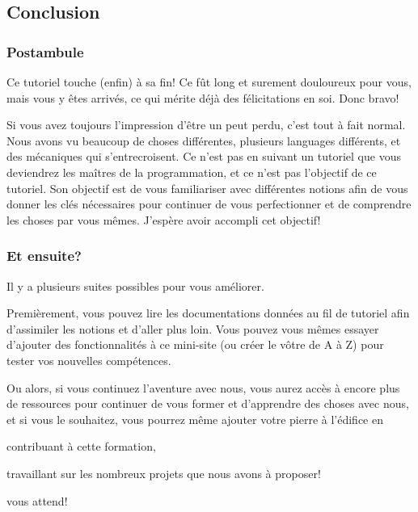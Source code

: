 \subsection{Conclusion}

\subsubsection[Postambule]{Postambule}

Ce tutoriel touche (enfin) à sa fin! Ce fût long et surement douloureux pour vous, mais vous y êtes arrivés, ce qui mérite déjà des félicitations en soi. Donc bravo!

Si vous avez toujours l'impression d'être un peut perdu, c'est tout à fait normal. Nous avons vu beaucoup de choses différentes, plusieurs languages différents, et des mécaniques qui s'entrecroisent. Ce n'est pas en suivant un tutoriel que vous deviendrez les maîtres de la programmation, et ce n'est pas l'objectif de ce tutoriel. Son objectif est de vous familiariser avec différentes notions afin de vous donner les clés nécessaires pour continuer de vous perfectionner et de comprendre les choses par vous mêmes. J'espère avoir accompli cet objectif!

\subsubsection[Et ensuite?]{Et ensuite?}

Il y a plusieurs suites possibles pour vous améliorer. 

Premièrement, vous pouvez lire les documentations données au fil de tutoriel afin d'assimiler les notions et d'aller plus loin. Vous pouvez vous mêmes essayer d'ajouter des fonctionnalités à ce mini-site (ou créer le vôtre de A à Z) pour tester vos nouvelles compétences.

Ou alors, si vous continuez l'aventure \nhitec{} avec nous, vous aurez accès à encore plus de ressources pour continuer de vous former et d'apprendre des choses avec nous, et si vous le souhaitez, vous pourrez même ajouter votre pierre à l'édifice en 
\begin{enumerate*} [1)]
    \item contribuant à cette formation,
    \item travaillant sur les nombreux projets que nous avons à proposer!
\end{enumerate*}

\nhitec{} vous attend!